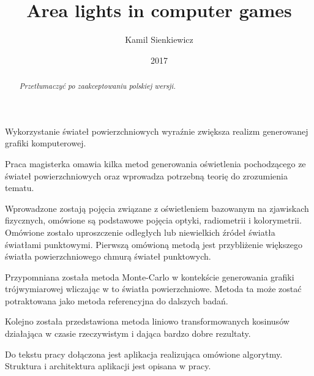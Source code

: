 \documentclass[pl]{minipw/minipw}
\title{Area lights in computer games}
\author{Kamil Sienkiewicz}
\date{2017}
\begin{document}
\sloppy
\setcounter{page}{1}

\begin{streszczenie}
Wykorzystanie świateł powierzchniowych wyraźnie zwiększa realizm generowanej grafiki komputerowej.

Praca magisterka omawia kilka metod generowania oświetlenia pochodzącego ze świateł powierzchniowych oraz wprowadza potrzebną teorię do zrozumienia tematu.

Wprowadzone zostają pojęcia związane z oświetleniem bazowanym na zjawiskach fizycznych, omówione są podstawowe pojęcia optyki, radiometrii i kolorymetrii. Omówione zostało uproszczenie odległych lub niewielkich źródeł światła światłami punktowymi. Pierwszą omówioną metodą jest przybliżenie większego światła powierzchniowego chmurą świateł punktowych.

Przypomniana została metoda Monte-Carlo w kontekście generowania grafiki trójwymiarowej wliczając w to światła powierzchniowe. Metoda ta może zostać potraktowana jako metoda referencyjna do dalszych badań.

Kolejno została przedstawiona metoda liniowo transformowanych kosinusów działająca w czasie rzeczywistym i dająca bardzo dobre rezultaty.

Do tekstu pracy dołączona jest aplikacja realizująca omówione algorytmy. Struktura i architektura aplikacji jest opisana w pracy.
\end{streszczenie}

\begin{abstract}
\textit{Przetłumaczyć po zaakceptowaniu polskiej wersji.}
\end{abstract}

\makestatement

\tableofcontents


\pagestyle{fancy}










\begin{appendices}

\end{appendices}

\printbibliography
\end{document}
